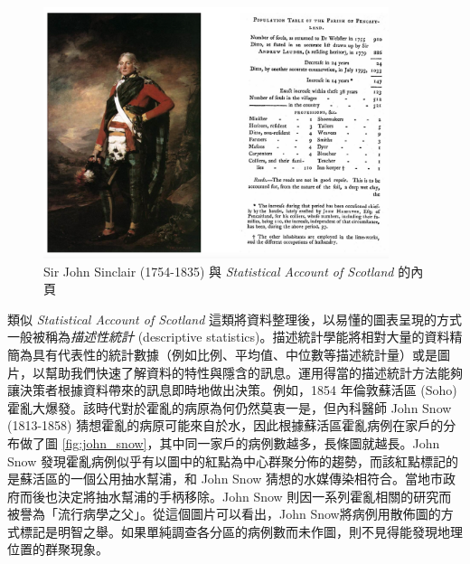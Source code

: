 \begin{figure}[htbp]
  \centering
  \includegraphics[width=0.9\textwidth]{figures/01-Overview/john_sinclair.png}
  \caption{Sir John Sinclair (1754-1835) 與 \textit{Statistical Account of Scotland} 的內頁}
  \label{fig:john_sinclair}
\end{figure}

    類似 \textit{Statistical Account of Scotland} 這類將資料整理後，以易懂的圖表呈現的方式一般被稱為\textit{描述性統計} (descriptive statistics)。描述統計學能將相對大量的資料精簡為具有代表性的統計數據（例如比例、平均值、中位數等描述統計量）或是圖片，以幫助我們快速了解資料的特性與隱含的訊息。運用得當的描述統計方法能夠讓決策者根據資料帶來的訊息即時地做出決策。例如，1854 年倫敦蘇活區 (Soho) 霍亂大爆發。該時代對於霍亂的病原為何仍然莫衷一是，但內科醫師 John Snow (1813-1858) 猜想霍亂的病原可能來自於水，因此根據蘇活區霍亂病例在家戶的分布做了圖 \ref{fig:john_snow}，其中同一家戶的病例數越多，長條圖就越長。John Snow 發現霍亂病例似乎有以圖中的紅點為中心群聚分佈的趨勢，而該紅點標記的是蘇活區的一個公用抽水幫浦，和 John Snow 猜想的水媒傳染相符合。當地市政府而後也決定將抽水幫浦的手柄移除。John Snow 則因一系列霍亂相關的研究而被譽為「流行病學之父」。從這個圖片可以看出，John Snow將病例用散佈圖的方式標記是明智之舉。如果單純調查各分區的病例數而未作圖，則不見得能發現地理位置的群聚現象。

